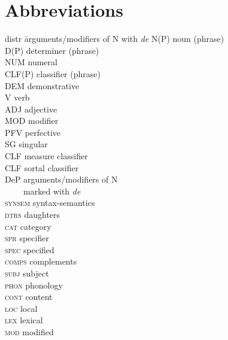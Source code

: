 \documentclass[output=paper,colorlinks,citecolor=brown]{langscibook}
\begin{document}
\newpage
\section*{Abbreviations}
\begin{multicols}{2}
\begin{tabbing}
distr \hspace{1em} \= arguments/modifiers of N  with \textit{de}\kill
N(P) \> noun (phrase)\\
D(P) \> determiner (phrase) \\
NUM \> numeral\\
CLF(P) \> classifier (phrase) \\
DEM \> demonstrative \\
\textsc{V} \> verb  \\
\textsc{ADJ} \> adjective \\
\textsc{MOD} \> modifier\\
\textsc{PFV} \> perfective\\
\textsc{SG} \> singular \\  
CLF \> measure classifier \\
CLF \> sortal classifier\\
DeP \> arguments/modifiers of N \\
\textcolor{white}{DeP} \> marked with \textit{de}\\%
\textsc{synsem} \> syntax-semantics \\ 
\textsc{dtrs} \> daughters\\
\textsc{cat} \> category\\ 
\textsc{spr} \> specifier\\ 
\textsc{spec} \> specified \\ 
\textsc{comps} \> complements\\
\textsc{subj} \> subject\\
\textsc{phon} \> phonology\\ 
\textsc{cont} \> content\\ 
\textsc{loc} \> local\\
\textsc{lex} \> lexical \\  
\textsc{mod} \> modified\\
\end{tabbing}
\end{multicols}


\sloppy
\printbibliography[heading=subbibliography,notkeyword=this]
\end{document}
